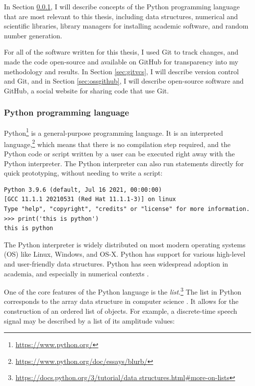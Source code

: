 \documentclass[report.tex]{subfiles}
\begin{document}
In Section \ref{sec:pythonbasics}, I will describe concepts of the Python programming language that are most relevant to this thesis, including data structures, numerical and scientific libraries, library managers for installing academic software, and random number generation.

For all of the software written for this thesis, I used Git to track changes, and made the code open-source and available on GitHub for transparency into my methodology and results. In Section \ref{sec:gitvcs}, I will describe version control and Git, and in Section \ref{sec:ossgithub}, I will describe open-source software and GitHub, a social website for sharing code that use Git.

\subsubsection{Python programming language}
\label{sec:pythonbasics}

Python\footnote{\url{https://www.python.org/}} is a general-purpose programming language. It is an interpreted language,\footnote{\url{https://www.python.org/doc/essays/blurb/}} which means that there is no compilation step required, and the Python code or script written by a user can be executed right away with the Python interpreter. The Python interpreter can also run statements directly for quick prototyping, without needing to write a script:

\begin{listing}[!ht]
\centering
\begin{BVerbatim}
Python 3.9.6 (default, Jul 16 2021, 00:00:00)
[GCC 11.1.1 20210531 (Red Hat 11.1.1-3)] on linux
Type "help", "copyright", "credits" or "license" for more information.
>>> print('this is python')
this is python
\end{BVerbatim}
\end{listing}

The Python interpreter is widely distributed on most modern operating systems (OS) like Linux, Windows, and OS-X. Python has support for various high-level and user-friendly data structures. Python has seen widespread adoption in academia, and especially in numerical contexts \parencite{pythonscience}.

One of the core features of the Python language is the \textit{list}.\footnote{\url{https://docs.python.org/3/tutorial/data structures.html\#more-on-lists}} The list in Python corresponds to the array data structure in computer science \parencite{skiena}. It allows for the construction of an ordered list of objects. For example, a discrete-time speech signal may be described by a list of its amplitude values:
\end{document}
